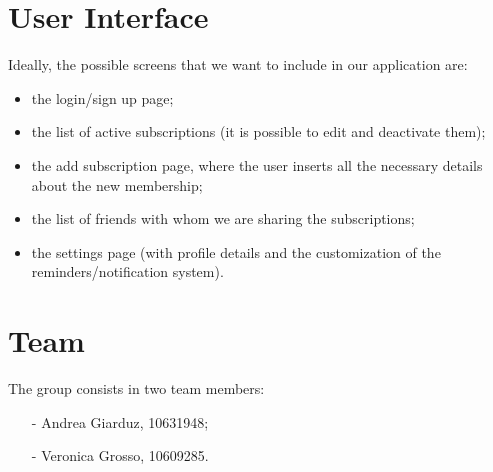 \documentclass[11pt]{article}
\begin{document}
\section{User Interface}
Ideally, the possible screens that we want to include in our application are:
\begin{itemize}
    \item the login/sign up page;
    \item the list of active subscriptions (it is possible to edit and deactivate them);
    \item the add subscription page, where the user inserts all the necessary details about the new membership;
    \item the list of friends with whom we are sharing the subscriptions;
    \item the settings page (with profile details and the customization of the reminders/notification system).
\end{itemize}

\section{Team}
The group consists in two team members:
\begin{itemize}
    \item[-] Andrea Giarduz, 10631948;
    \item[-] Veronica Grosso, 10609285.
\end{itemize}
\end{document}
